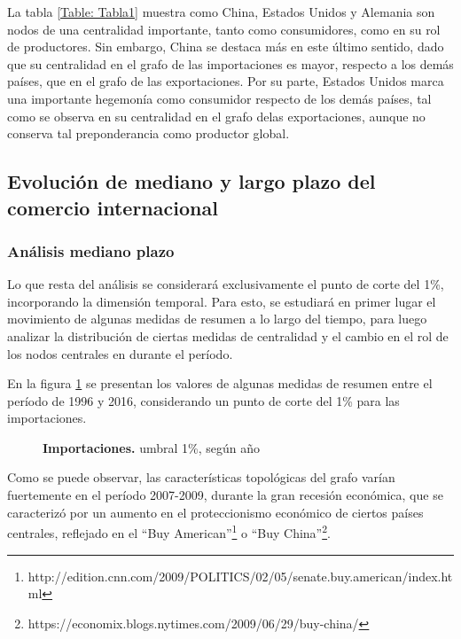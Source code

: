 \documentclass[class=article, crop=false]{standalone}
\begin{document}
La tabla \ref{Table: Tabla1} muestra como China, Estados Unidos y Alemania son nodos de una centralidad importante, tanto como consumidores, como en su rol de productores. Sin embargo, China se destaca más en este último sentido, dado que su centralidad en el grafo de las importaciones es mayor, respecto a los demás países, que en el grafo de las exportaciones. Por su parte, Estados  Unidos marca una importante hegemonía como consumidor respecto de los demás países, tal como se observa en su centralidad en el grafo delas exportaciones, aunque no conserva tal preponderancia como productor global. 

\subsection{Evolución de mediano y largo plazo del comercio internacional}

\subsubsection{Análisis mediano plazo}

Lo que resta del análisis se considerará exclusivamente el punto de corte del 1\%, incorporando la dimensión temporal. Para esto, se estudiará en primer lugar el movimiento de algunas medidas de resumen a lo largo del tiempo, para luego analizar la distribución de ciertas medidas de centralidad y el cambio en el rol de los nodos centrales en durante el período.


En la figura \ref{fig:caracteristicas_yr} se presentan los valores de algunas medidas de resumen entre el período de 1996 y 2016, considerando un punto de corte del 1\% para las importaciones. 



\begin{figure}
\centering
{}
\caption{\textbf{Importaciones.} umbral 1\%, según año}
\label{fig:caracteristicas_yr}
\end{figure}


Como se puede observar, las características topológicas del grafo varían fuertemente en el período 2007-2009, durante la gran recesión económica, que se caracterizó por un aumento en el proteccionismo económico de ciertos países centrales, reflejado en el “Buy American”\footnote{http://edition.cnn.com/2009/POLITICS/02/05/senate.buy.american/index.html} o “Buy China”\footnote{https://economix.blogs.nytimes.com/2009/06/29/buy-china/}. 
\end{document}
